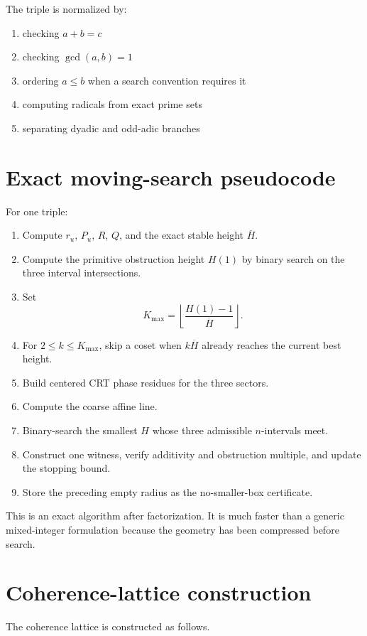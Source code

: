 The triple is normalized by:

\begin{enumerate}[leftmargin=1.5em]
\item checking $a+b=c$
\item checking $\gcd(a,b)=1$
\item ordering $a\le b$ when a search convention requires it
\item computing radicals from exact prime sets
\item separating dyadic and odd-adic branches
\end{enumerate}

\section{Exact moving-search pseudocode}
For one triple:

\begin{enumerate}[leftmargin=1.5em]
\item Compute $r_u$, $P_u$, $R$, $Q$, and the exact stable height $\overline H$.
\item Compute the primitive obstruction height $H(1)$ by binary search on the three interval intersections.
\item Set
\[
 K_{\max}
 =
 \left\lfloor\frac{H(1)-1}{\overline H}\right\rfloor.
\]
\item For $2\le k\le K_{\max}$, skip a coset when $k\overline H$ already reaches the current best height.
\item Build centered CRT phase residues for the three sectors.
\item Compute the coarse affine line.
\item Binary-search the smallest $H$ whose three admissible $n$-intervals meet.
\item Construct one witness, verify additivity and obstruction multiple, and update the stopping bound.
\item Store the preceding empty radius as the no-smaller-box certificate.
\end{enumerate}

This is an exact algorithm after factorization. It is much faster than a generic mixed-integer formulation because the geometry has been compressed before search.

\section{Coherence-lattice construction}
The coherence lattice is constructed as follows.

